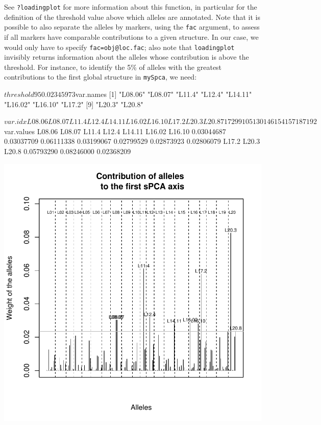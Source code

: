 \documentclass{article}
\begin{document}
\noindent See \texttt{?loadingplot} for more information about this
function, in particular for the definition of the threshold value
above which alleles are annotated.
Note that it is possible to also separate the alleles by markers,
using the \texttt{fac} argument, to assess if all markers have
comparable contributions to a given structure.
In our case, we would only have to specify \texttt{fac=obj@loc.fac};
also note that \texttt{loadingplot} invisibly returns information
about the alleles whose contribution is above the threshold.
For instance, to identify the 5\% of alleles with the greatest
contributions to the first global structure in \texttt{mySpca}, we need:
\begin{Schunk}
\begin{Soutput}
$threshold
       95%
0.02345973 

$var.names
 [1] "L08.06" "L08.07" "L11.4"  "L12.4"  "L14.11" "L16.02" "L16.10" "L17.2" 
 [9] "L20.3"  "L20.8" 

$var.idx
L08.06 L08.07  L11.4  L12.4 L14.11 L16.02 L16.10  L17.2  L20.3  L20.8 
    71     72     99    105    130    146    154    157    187    192 

$var.values
    L08.06     L08.07      L11.4      L12.4     L14.11     L16.02     L16.10 
0.03044687 0.03037709 0.06111338 0.03199067 0.02799529 0.02873923 0.02806079 
     L17.2      L20.3      L20.8 
0.05793290 0.08246000 0.02368209 
\end{Soutput}
\end{Schunk}
\includegraphics{figs/spca-025}
\end{document}
